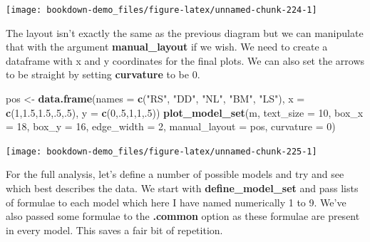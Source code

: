 \documentclass[
]{book}
\newenvironment{Shaded}{\begin{snugshade}}{\end{snugshade}}
\newcommand{\DataTypeTok}[1]{\textcolor[rgb]{0.13,0.29,0.53}{#1}}
\newcommand{\DecValTok}[1]{\textcolor[rgb]{0.00,0.00,0.81}{#1}}
\newcommand{\FloatTok}[1]{\textcolor[rgb]{0.00,0.00,0.81}{#1}}
\newcommand{\KeywordTok}[1]{\textcolor[rgb]{0.13,0.29,0.53}{\textbf{#1}}}
\newcommand{\NormalTok}[1]{#1}
\newcommand{\StringTok}[1]{\textcolor[rgb]{0.31,0.60,0.02}{#1}}
\begin{document}
\begin{center}\texttt{[image: bookdown-demo\_files/figure-latex/unnamed-chunk-224-1]} \end{center}

The layout isn't exactly the same as the previous diagram but we can manipulate that with the argument \textbf{manual\_layout} if we wish. We need to create a dataframe with x and y coordinates for the final plots. We can also set the arrows to be straight by setting \textbf{curvature} to be 0.

\begin{Shaded}
\begin{Highlighting}[]
\NormalTok{pos \textless{}{-}}\StringTok{ }\KeywordTok{data.frame}\NormalTok{(}\DataTypeTok{names =} \KeywordTok{c}\NormalTok{(}\StringTok{"RS"}\NormalTok{, }\StringTok{"DD"}\NormalTok{, }\StringTok{"NL"}\NormalTok{, }\StringTok{"BM"}\NormalTok{, }\StringTok{"LS"}\NormalTok{),}
                  \DataTypeTok{x =} \KeywordTok{c}\NormalTok{(}\DecValTok{1}\NormalTok{,}\FloatTok{1.5}\NormalTok{,}\FloatTok{1.5}\NormalTok{,.}\DecValTok{5}\NormalTok{,.}\DecValTok{5}\NormalTok{),}
                  \DataTypeTok{y =} \KeywordTok{c}\NormalTok{(}\DecValTok{0}\NormalTok{,.}\DecValTok{5}\NormalTok{,}\DecValTok{1}\NormalTok{,}\DecValTok{1}\NormalTok{,.}\DecValTok{5}\NormalTok{))}
\KeywordTok{plot\_model\_set}\NormalTok{(m, }\DataTypeTok{text\_size =} \DecValTok{10}\NormalTok{, }\DataTypeTok{box\_x =} \DecValTok{18}\NormalTok{, }\DataTypeTok{box\_y =} \DecValTok{16}\NormalTok{,}
               \DataTypeTok{edge\_width =} \DecValTok{2}\NormalTok{, }\DataTypeTok{manual\_layout =}\NormalTok{ pos, }\DataTypeTok{curvature =} \DecValTok{0}\NormalTok{)}
\end{Highlighting}
\end{Shaded}

\begin{center}\texttt{[image: bookdown-demo\_files/figure-latex/unnamed-chunk-225-1]} \end{center}

For the full analysis, let's define a number of possible models and try and see which best describes the data. We start with \textbf{define\_model\_set} and pass lists of formulae to each model which here I have named numerically 1 to 9. We've also passed some formulae to the \textbf{.common} option as these formulae are present in every model. This saves a fair bit of repetition.
\end{document}
